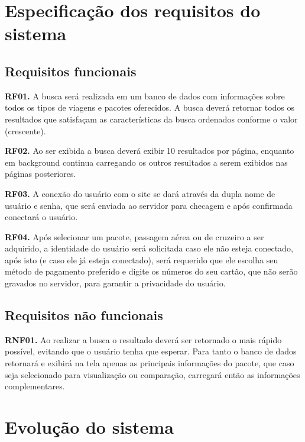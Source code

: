 \documentclass[12pt]{article}
\begin{document}
\section{Especificação dos requisitos do sistema}
\label{sec:req_sistema}
\subsection{Requisitos funcionais}

{\bf RF01.} A busca será realizada em um banco de dados com informações sobre todos os tipos de viagens e pacotes oferecidos. A busca deverá retornar todos os resultados que satisfaçam as características da busca ordenados conforme o valor (crescente).


\bigskip
{\bf RF02.} Ao ser exibida a busca deverá exibir 10 resultados por página, enquanto em background continua carregando os outros resultados a serem exibidos nas páginas posteriores.


\bigskip
{\bf RF03.} A conexão do usuário com o site se dará através da dupla nome de usuário e senha, que será enviada ao servidor para checagem e após confirmada conectará o usuário.


\bigskip
{\bf RF04.} Após selecionar um pacote, passagem aérea ou de cruzeiro a ser adquirido, a identidade do usuário será solicitada caso ele não esteja conectado, após isto (e caso ele já esteja conectado), será requerido que ele escolha seu método de pagamento preferido e digite os números do seu cartão, que não serão gravados no servidor, para garantir a privacidade do usuário.

\subsection{Requisitos não funcionais}

{\bf RNF01.} Ao realizar a busca o resultado deverá ser retornado o mais rápido possível, evitando que o usuário tenha que esperar. Para tanto o banco de dados retornará e exibirá na tela apenas as principais informações do pacote, que caso seja selecionado para visualização ou comparação, carregará então as informações complementares.

\clearpage
\section{Evolução do sistema}
\label{sec:evolucao}
\end{document}
